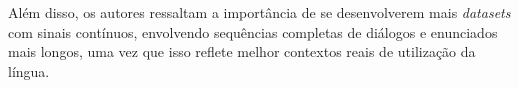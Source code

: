 \begin{enumerate}



            Além disso, os autores ressaltam a importância de se desenvolverem mais \textit{datasets} com sinais contínuos, envolvendo sequências completas de diálogos e enunciados mais longos, uma vez que isso reflete melhor contextos reais de utilização da língua.


\end{enumerate}












